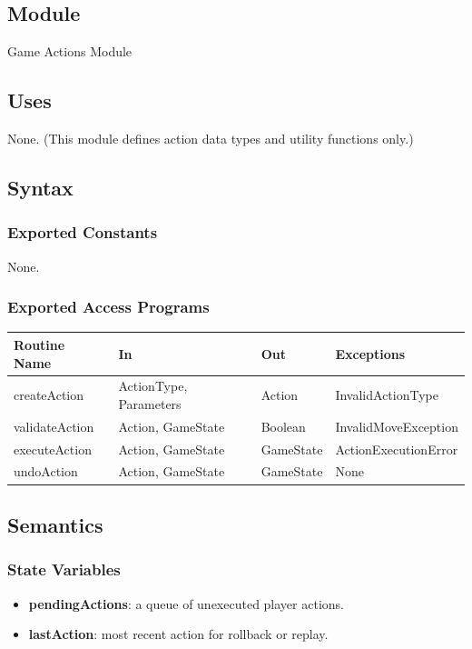 \documentclass[12pt, titlepage]{article}
\begin{document}
\subsection{Module}
Game Actions Module

\subsection{Uses}
None. (This module defines action data types and utility functions only.)

\subsection{Syntax}

\subsubsection{Exported Constants}
None.

\subsubsection{Exported Access Programs}
\begin{center}

    \begin{tabular}{p{3.5cm} p{3.5cm} p{3cm} >{\raggedright\arraybackslash}p{4cm}}
        \toprule
        \textbf{Routine Name} & \textbf{In} & \textbf{Out} & \textbf{Exceptions} \\
        \midrule
        createAction & ActionType, Parameters & Action & InvalidActionType \\
        validateAction & Action, GameState & Boolean & InvalidMoveException \\
        executeAction & Action, GameState & GameState & ActionExecutionError \\
        undoAction & Action, GameState & GameState & None \\
        \bottomrule
    \end{tabular}
\end{center}

\subsection{Semantics}

\subsubsection{State Variables}
\begin{itemize}
    \item \textbf{pendingActions}: a queue of unexecuted player actions.
    \item \textbf{lastAction}: most recent action for rollback or replay.
\end{itemize}
\end{document}

